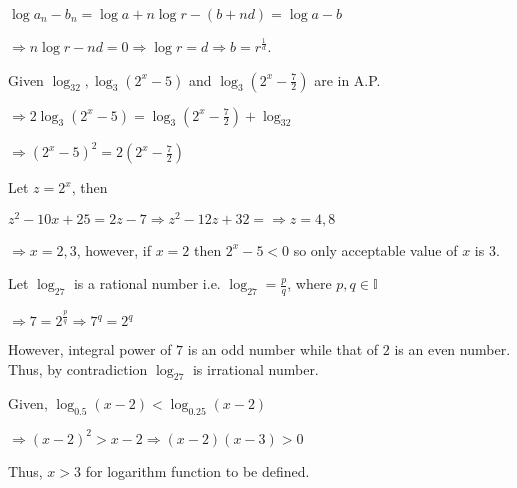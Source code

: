  $\log a_n - b_n = \log a + n\log r - (b + nd) = \log a - b$

  $\Rightarrow n\log r - nd = 0 \Rightarrow \log r = d \Rightarrow b = r^{\tfrac{1}{d}}$.
\item Given $\log_32, \log_3(2^x - 5)$ and $\log_3\left(2^x - \frac{7}{2}\right)$ are in A.P.

  $\Rightarrow 2\log_3(2^x - 5) = \log_3\left(2^x - \frac{7}{2}\right) + \log_32$

  $\Rightarrow (2^x - 5)^2 = 2\left(2^x - \frac{7}{2}\right)$

  Let $z = 2^x$, then

  $z^2 - 10x  + 25 = 2z - 7 \Rightarrow z^2 - 12z + 32 = \Rightarrow z = 4, 8$

  $\Rightarrow x = 2, 3$, however, if $x = 2$ then $2^x - 5 < 0$ so only acceptable value of $x$ is $3$.
\item Let $\log_27$ is a rational number i.e. $\log_27 = \frac{p}{q}$, where $p, q\in\mathbb{I}$

  $\Rightarrow 7 = 2^{\tfrac{p}{q}} \Rightarrow 7^q = 2^q$

  However, integral power of $7$ is an odd number while that of $2$ is an even number. Thus, by contradiction
  $\log_27$ is irrational number.
\item Given, $\log_{0.5}(x - 2) < \log_{0.25}(x - 2)$

  $\Rightarrow (x- 2)^2 > x - 2 \Rightarrow (x - 2)(x - 3) > 0$

  Thus, $x > 3$ for logarithm function to be defined.
\stopitemize
